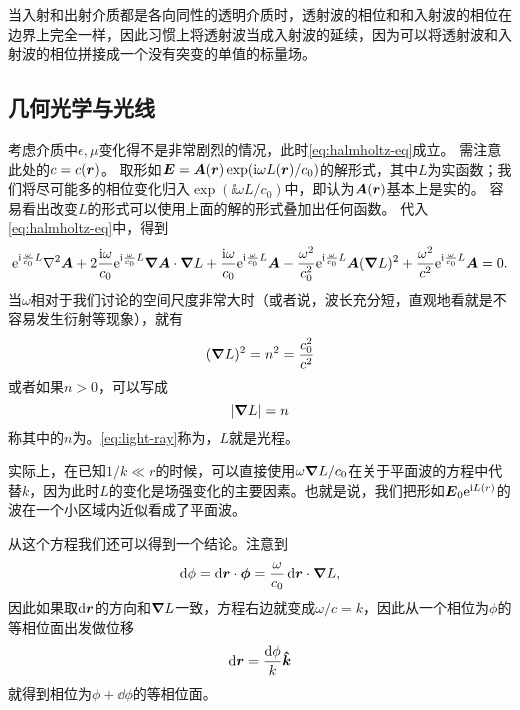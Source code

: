 当入射和出射介质都是各向同性的透明介质时，透射波的相位和和入射波的相位在边界上完全一样，因此习惯上将透射波当成入射波的延续，因为可以将透射波和入射波的相位拼接成一个没有突变的单值的标量场。

\subsection{几何光学与光线}

考虑介质中$\epsilon, \mu$变化得不是非常剧烈的情况，此时\eqref{eq:halmholtz-eq}成立。
需注意此处的$c=c(\vb*{r})$。
取形如$\vb*{E} = \vb*{A}(\vb*{r}) \exp (\mathrm{i} \omega L(\vb*{r}) / c_0)$的解形式，其中$L$为实函数；我们将尽可能多的相位变化归入$\exp(\ii \omega L / c_0)$中，即认为$\vb*{A}(\vb*{r})$基本上是实的。
容易看出改变$L$的形式可以使用上面的解的形式叠加出任何函数。
代入\eqref{eq:halmholtz-eq}中，得到
\begin{equation}
    \ee^{\ii \frac{\omega}{c_0} L} \laplacian \vb*{A} 
    + 2 \frac{\ii \omega}{c_0} \ee^{\ii \frac{\omega}{c_0} L} \grad{\vb*{A}} \cdot \grad{L} 
    + \frac{\ii \omega}{c_0} \ee^{\ii \frac{\omega}{c_0} L} \vb*{A} 
    - \frac{\omega^2}{c_0^2} \ee^{\ii \frac{\omega}{c_0} L} \vb*{A} (\grad{L})^2 
    + \frac{\omega^2}{c^2} \ee^{\ii \frac{\omega}{c_0} L} \vb*{A} = 0.
    \label{eq:expanded-wave-eq}
\end{equation}
当$\omega$相对于我们讨论的空间尺度非常大时（或者说，波长充分短，直观地看就是不容易发生衍射等现象），就有
\begin{equation}
    (\grad{L})^2 = n^2 = \frac{c_0^2}{c^2}
    \label{eq:optical-distance}
\end{equation}
或者如果$n>0$，可以写成
\[
    \abs{\grad{L}} = n
\]
称其中的$n$为。\eqref{eq:light-ray}称为，$L$就是光程。

实际上，在已知$1/k \ll r$的时候，可以直接使用$\omega\grad{L}/c_0$在关于平面波的方程中代替$k$，因为此时$L$的变化是场强变化的主要因素。也就是说，我们把形如$\vb*{E}_0 \mathrm{e}^{\mathrm{i} L(r)}$的波在一个小区域内近似看成了平面波。

从这个方程我们还可以得到一个结论。注意到
\[
    \dd{\phi} = \dd{\vb*{r}} \cdot \vb*{\phi} = \frac{\omega}{c_0} \dd{\vb*{r}} \cdot \grad{L},
\]
因此如果取$\dd{\vb*{r}}$的方向和$\grad{L}$一致，方程右边就变成$\omega / c = k$，因此从一个相位为$\phi$的等相位面出发做位移
\begin{equation}
    \dd{\vb*{r}} = \frac{\dd{\phi}}{k}\vu*{k}
    \label{eq:phrase-movement}
\end{equation}
就得到相位为$\phi + \dd{\phi}$的等相位面。

